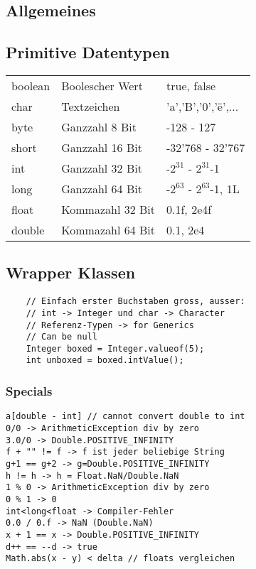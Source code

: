 

\newcommand{\SUBJECT}{}
\newcommand{\TITLE}{Cheat Sheet Objektorientierte Programmierung}



% 

\begin{multicols*}{5}
    \setlength{\columnseprule}{0.4pt}
		\footnotesize
		
% 

\section{Allgemeines}
	\subsection{Primitive Datentypen}
		\begin{tabular}{p{.7cm} | p{2.1cm} | l}
			boolean&Boolescher Wert&true, false\\
			char&Textzeichen&'a','B','0','ë',...\\
			byte&Ganzzahl 8 Bit&-128 - 127\\
			short&Ganzzahl 16 Bit&-32'768 - 32'767\\
			int&Ganzzahl 32 Bit&-$2^{31}$ - $2^{31}$-1\\
			long&Ganzzahl 64 Bit&-$2^{63}$ - $2^{63}$-1, 1L\\
			float&Kommazahl 32 Bit&0.1f, 2e4f\\
			double&Kommazahl 64 Bit&0.1, 2e4\\
		\end{tabular}
	\subsection{Wrapper Klassen}
	\begin{lstlisting}
	// Einfach erster Buchstaben gross, ausser:
	// int -> Integer und char -> Character
	// Referenz-Typen -> for Generics
	// Can be null
	Integer boxed = Integer.valueof(5);
	int unboxed = boxed.intValue();
	\end{lstlisting}
		\subsubsection{Specials}
		\begin{lstlisting}
a[double - int] // cannot convert double to int
0/0 -> ArithmeticException div by zero
3.0/0 -> Double.POSITIVE_INFINITY
f + "" != f -> f ist jeder beliebige String
g+1 == g+2 -> g=Double.POSITIVE_INFINITY
h != h -> h = Float.NaN/Double.NaN
1 % 0 -> ArithmeticException div by zero
0 % 1 -> 0
int<long<float -> Compiler-Fehler
0.0 / 0.f -> NaN (Double.NaN)
x + 1 == x -> Double.POSITIVE_INFINITY
d++ == --d -> true
Math.abs(x - y) < delta // floats vergleichen
		\end{lstlisting}


\end{multicols*}
